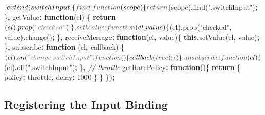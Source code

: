 \documentclass[
]{krantz}
\makeatletter
\newenvironment{Shaded}{\begin{snugshade}}{\end{snugshade}}
\newcommand{\CommentTok}[1]{\textcolor[rgb]{0.37,0.37,0.37}{\textit{#1}}}
\newcommand{\ControlFlowTok}[1]{\textcolor[rgb]{0.27,0.27,0.27}{\textbf{#1}}}
\newcommand{\DataTypeTok}[1]{\textcolor[rgb]{0.27,0.27,0.27}{#1}}
\newcommand{\DecValTok}[1]{\textcolor[rgb]{0.06,0.06,0.06}{#1}}
\newcommand{\FunctionTok}[1]{\textcolor[rgb]{0,0,0}{#1}}
\newcommand{\KeywordTok}[1]{\textcolor[rgb]{0.27,0.27,0.27}{\textbf{#1}}}
\newcommand{\NormalTok}[1]{#1}
\newcommand{\OperatorTok}[1]{\textcolor[rgb]{0.43,0.43,0.43}{\textbf{#1}}}
\newcommand{\StringTok}[1]{\textcolor[rgb]{0.5,0.5,0.5}{#1}}
\newenvironment{kframe}{%
\medskip{}
\setlength{\fboxsep}{.8em}
 \def\at@end@of@kframe{}%
 \ifinner\ifhmode%
  \def\at@end@of@kframe{\end{minipage}}%
  \begin{minipage}{\columnwidth}%
 \fi\fi%
 \def\FrameCommand##1{\hskip\@totalleftmargin \hskip-\fboxsep
 \colorbox{shadecolor}{##1}\hskip-\fboxsep
     \hskip-\linewidth \hskip-\@totalleftmargin \hskip\columnwidth}%
 \MakeFramed {\advance\hsize-\width
   \@totalleftmargin\z@ \linewidth\hsize
   \@setminipage}}%
 {\par\unskip\endMakeFramed%
 \at@end@of@kframe}
\renewenvironment{Shaded}{\begin{kframe}}{\end{kframe}}
\makeatother
\begin{document}
\begin{Shaded}
\begin{Highlighting}[]
\NormalTok{$}\OperatorTok{.}\FunctionTok{extend}\NormalTok{(switchInput}\OperatorTok{,}\NormalTok{ \{}
  \DataTypeTok{find}\OperatorTok{:} \KeywordTok{function}\NormalTok{(scope) \{}
    \ControlFlowTok{return}\NormalTok{ $(scope)}\OperatorTok{.}\FunctionTok{find}\NormalTok{(}\StringTok{".switchInput"}\NormalTok{)}\OperatorTok{;}
\NormalTok{  \}}\OperatorTok{,}
  \DataTypeTok{getValue}\OperatorTok{:} \KeywordTok{function}\NormalTok{(el) \{}
    \ControlFlowTok{return}\NormalTok{ $(el)}\OperatorTok{.}\FunctionTok{prop}\NormalTok{(}\StringTok{"checked"}\NormalTok{)}\OperatorTok{;}
\NormalTok{  \}}\OperatorTok{,}
  \DataTypeTok{setValue}\OperatorTok{:} \KeywordTok{function}\NormalTok{(el}\OperatorTok{,}\NormalTok{ value) \{}
\NormalTok{    $(el)}\OperatorTok{.}\FunctionTok{prop}\NormalTok{(}\StringTok{"checked"}\OperatorTok{,}\NormalTok{ value)}\OperatorTok{.}\FunctionTok{change}\NormalTok{()}\OperatorTok{;}
\NormalTok{  \}}\OperatorTok{,}
  \DataTypeTok{receiveMessage}\OperatorTok{:} \KeywordTok{function}\NormalTok{(el}\OperatorTok{,}\NormalTok{ value)\{}
    \KeywordTok{this}\OperatorTok{.}\FunctionTok{setValue}\NormalTok{(el}\OperatorTok{,}\NormalTok{ value)}\OperatorTok{;}
\NormalTok{  \}}\OperatorTok{,}
  \DataTypeTok{subscribe}\OperatorTok{:} \KeywordTok{function}\NormalTok{ (el}\OperatorTok{,}\NormalTok{ callback) \{}
\NormalTok{    $(el)}\OperatorTok{.}\FunctionTok{on}\NormalTok{(}\StringTok{"change.switchInput"}\OperatorTok{,} \KeywordTok{function}\NormalTok{()\{}
\NormalTok{      callback(}\KeywordTok{true}\NormalTok{)}\OperatorTok{;}
\NormalTok{    \})}
\NormalTok{  \}}\OperatorTok{,}
  \DataTypeTok{unsubscribe}\OperatorTok{:} \KeywordTok{function}\NormalTok{(el) \{}
\NormalTok{    $(el)}\OperatorTok{.}\FunctionTok{off}\NormalTok{(}\StringTok{".switchInput"}\NormalTok{)}\OperatorTok{;}
\NormalTok{  \}}\OperatorTok{,}
  \CommentTok{// throttle}
  \DataTypeTok{getRatePolicy}\OperatorTok{:} \KeywordTok{function}\NormalTok{()\{}
    \ControlFlowTok{return}\NormalTok{ \{}
      \DataTypeTok{policy}\OperatorTok{:} \StringTok{\textquotesingle{}throttle\textquotesingle{}}\OperatorTok{,}
      \DataTypeTok{delay}\OperatorTok{:} \DecValTok{1000}
\NormalTok{    \}}
\NormalTok{  \}}
\NormalTok{\})}\OperatorTok{;}
\end{Highlighting}
\end{Shaded}

\hypertarget{shiny-input-register}{%
\subsection{Registering the Input Binding}\label{shiny-input-register}}
\end{document}
